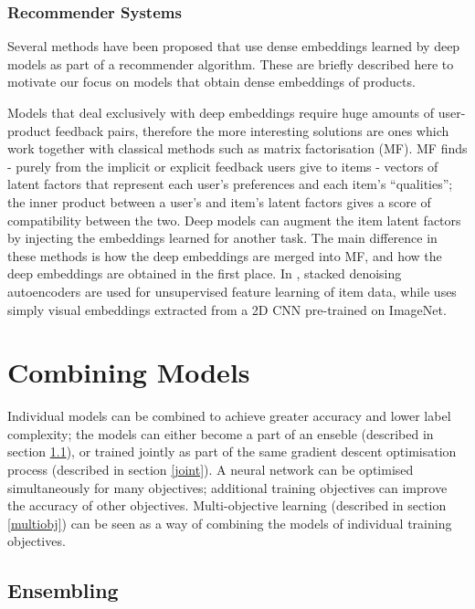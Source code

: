 \subsubsection{Recommender Systems}
\label{rec}

Several methods have been proposed that use dense embeddings learned by deep models as part of a recommender algorithm.
These are briefly described here to motivate our focus on models that obtain dense embeddings of products.

Models that deal exclusively with deep embeddings \cite{mvdl} require huge amounts of user-product feedback pairs, therefore the more interesting solutions are ones which work together with classical methods such as matrix factorisation (MF).
MF finds - purely from the implicit or explicit feedback users give to items - vectors of latent factors that represent each user's preferences and each item's ``qualities''; the inner product between a user's and item's latent factors gives a score of compatibility between the two.
Deep models can augment the item latent factors by injecting the embeddings learned for another task.
The main difference in these methods is how the deep embeddings are merged into MF, and how the deep embeddings are obtained in the first place.
In \cite{cdl}, stacked denoising autoencoders are used for unsupervised feature learning of item data, while \cite{dl_mf} uses simply visual embeddings extracted from a 2D CNN pre-trained on ImageNet.

\section{Combining Models}
\label{bg_ensembling}

Individual models can be combined to achieve greater accuracy and lower label complexity; the models can either become a part of an enseble (described in section \ref{ens}), or trained jointly as part of the same gradient descent optimisation process (described in section \ref{joint}).
A neural network can be optimised simultaneously for many objectives; additional training objectives can improve the accuracy of other objectives.
Multi-objective learning (described in section \ref{multiobj}) can be seen as a way of combining the models of individual training objectives.

\subsection{Ensembling}
\label{ens}

